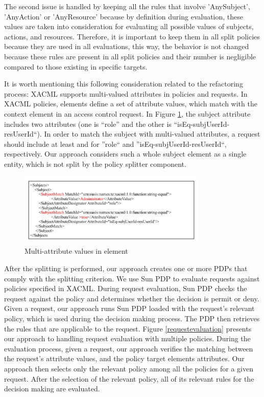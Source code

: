 The second issue is handled by keeping all the rules that involve 'AnySubject', 'AnyAction' or 'AnyResource' because by definition during 
evaluation, these values are taken into consideration for evaluating all possible values of subjects, actions, and resources. 
Therefore, it is important to keep them in all split policies because they are used in all evaluations, this way, the behavior is not changed because these rules are present in all split policies and 
their number is negligible compared to those existing in specific targets. 


It is worth mentioning this following consideration related to the refactoring process:
XACML supports multi-valued attributes in policies and requests. In XACML policies,  elements define a set of attribute values, which match with 
the context element in 
an access control request. In Figure \ref{xacml-match}, the subject attribute includes two attributes (one is ``role'' and the other 
is ``isEq-subjUserId-resUserId``). In order to match the subject with multi-valued attributes, a request should include at least  and  
for ''role`` and ''isEq-subjUserId-resUserId``, respectively.
Our approach considers such a whole subject element as a single entity, which is not split by the policy splitter component.
\begin{figure}[!h]
\begin{center}
\includegraphics[width=9cm, height=3.5cm]{xacml-match}
\caption{Multi-attribute values in  element}
\label{xacml-match}
\end{center}
\end{figure}

After the splitting is performed, our approach creates one or more PDPs that comply with the splitting criterion.
We use Sun PDP \cite{sunxacml} to evaluate requests against policies specified in XACML.
During request evaluation, Sun PDP checks the request against the policy and determines whether the
decision is permit or deny. Given a request, our approach runs Sun PDP loaded with the request's relevant policy,
 which is used during the decision making process. The PDP then retrieves the rules that are applicable to the request.
Figure \ref{requestevaluation} presents our approach to handling request evaluation with multiple policies. 
During the evaluation process, given a request, our approach verifies the matching between the request's attribute values, 
and the policy target elements attributes. Our approach then selects only the relevant policy among all the policies for a given request.
After the selection of the relevant policy, all of its relevant rules for the decision making are evaluated.

